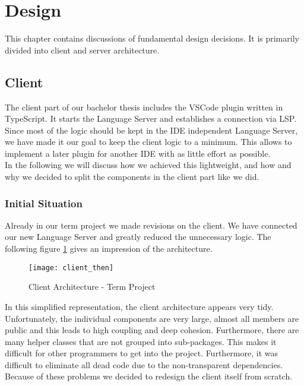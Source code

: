 \section{Design}
This chapter contains discussions of fundamental design decisions.
It is primarily divided into client and server architecture.

\subsection{Client}
The client part of our bachelor thesis includes the VSCode plugin written in TypeScript.
It starts the Language Server and establishes a connection via LSP.\\

Since most of the logic should be kept in the IDE independent Language Server,
we have made it our goal to keep the client logic to a minimum.
This allows to implement a later plugin for another IDE with as little effort as possible. \\

In the following we will discuss how we achieved this lightweight,
and how and why we decided to split the components in the client part like we did.

\subsubsection{Initial Situation}
Already in our term project we made revisions on the client.
We have connected our new Language Server and greatly reduced the unnecessary logic.
The following figure \ref{fig:client_then} gives an impression of the architecture.

\begin{figure}[H]
    \centering
    \texttt{[image: client\_then]}
    \caption{Client Architecture - Term Project}
    \label{fig:client_then}
\end{figure}

In this simplified representation, the client architecture appears very tidy.
Unfortunately, the individual components are very large,
almost all members are public and this leads to high coupling and deep cohesion.
Furthermore, there are many helper classes that are not grouped into sub-packages.
This makes it difficult for other programmers to get into the project. Furthermore,
it was difficult to eliminate all dead code due to the non-transparent dependencies. \\

Because of these problems we decided to redesign the client itself from scratch.

